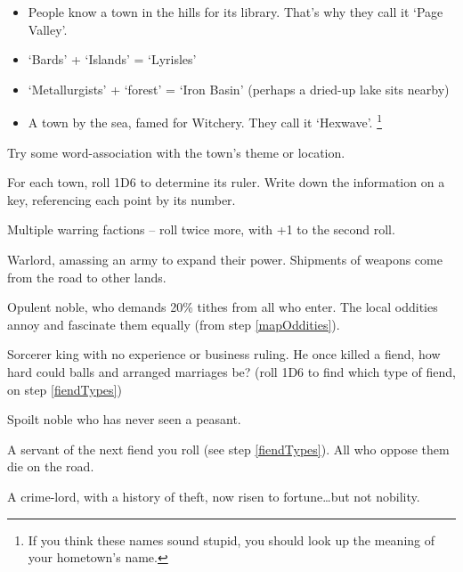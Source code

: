 \begin{multicols}{2}
\begin{itemize}
  \item
  People know a town in the hills for its library. That's why they call
  it `Page Valley'.
  \item
  `Bards' + `Islands' = `Lyrisles'
  \item
  `Metallurgists' + `forest' = `Iron Basin' (perhaps a dried-up lake sits nearby)
  \item
  A town by the sea, famed for Witchery.
  They call it `Hexwave'.%
  \footnote{If you think these names sound stupid, you should look up the meaning of your hometown's name.}
\end{itemize}

Try some word-association with the town's theme or location.


For each town, roll 1D6 to determine its ruler.
Write down the information on a key, referencing each point by its number.

\begin{dlist}
  \item
  Multiple warring factions -- roll twice more, with +1 to the second roll.
  \item
  Warlord, amassing an army to expand their power.
  Shipments of weapons come from the road to other lands.
  \item
  Opulent noble, who demands 20\% tithes from all who enter.
  The local oddities annoy and fascinate them equally (from step \ref{mapOddities}).
  \item
  Sorcerer king with no experience or business ruling.
  He once killed a fiend, how hard could balls and arranged marriages be?
  (roll 1D6 to find which type of fiend, on step \ref{fiendTypes})
  \item
  Spoilt noble who has never seen a peasant.
  \item
  A servant of the next fiend you roll (see step \ref{fiendTypes}).
  All who oppose them die on the road.
  \item
  A crime-lord, with a history of theft, now risen to fortune\ldots but not nobility.

\end{dlist}



\end{multicols}
